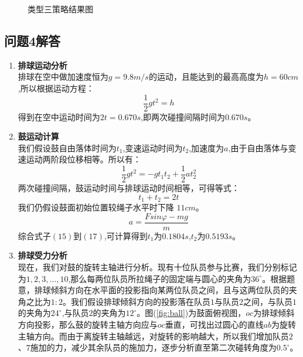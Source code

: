 \documentclass{cumcm}
\begin{document}
\begin{itemize}
\begin{figure}[H]
\caption{类型三策略结果图}
\label{figtype4}
\end{figure}



\end{itemize}
\subsection{问题4解答}
\begin{enumerate}
\item \textbf{排球运动分析}\\
排球在空中做加速度恒为$g=9.8m/s$的运动，且能达到的最高高度为$h=60cm$,所以根据运动方程：
\begin{displaymath}
\frac{1}{2}gt^2=h
\end{displaymath}
得到在空中运动时间为$2t=0.670s$,即两次碰撞间隔时间为$0.670s$。
\item\textbf{鼓运动计算}\\
我们假设鼓自由落体时间为$t_1$,变速运动时间为$t_2$,加速度为$a$,由于自由落体与变速运动两阶段位移相等。所以有：
\begin{equation}
\frac{1}{2}gt^2=-gt_1t_2+\frac{1}{2}at_2^2
\end{equation}
两次碰撞间隔，鼓运动时间与排球运动时间相等，可得等式：
\begin{equation}
t_1+t_2=2t
\end{equation}
我们仍假设鼓面初始位置较绳子水平时下降 $11cm$。
\begin{equation}
a=\frac{Fsin\varphi-mg}{m}
\end{equation}
综合式子$(15)$到$(17)$,可计算得到$t_1$为$0.1804s$,$t_2$为$0.5193s$。
\item \textbf{排球受力分析}\\
现在，我们对鼓的旋转主轴进行分析。现有十位队员参与比赛，我们分别标记为$1,2,3,\dots,10$,那么每两位队员所拉绳子的固定端与圆心的夹角为$36^{\circ}$。根据题意，排球倾斜方向在水平面的投影指向某两位队员之间，且与这两位队员的夹角之比为$1:2$。我们假设排球倾斜方向的投影落在队员$1$与队员$2$之间，与队员$1$的夹角为$24^{\circ}$,与队员$2$的夹角为$12^{\circ}$。图(\ref{fig:ball})为鼓面俯视图，$oc$为排球倾斜方向投影，那么鼓的旋转主轴方向应与$oc$垂直，可找出过圆心的直线$ab$为旋转主轴方向。而由于离旋转主轴越远，对旋转的影响越大，所以我们增加队员$2$、$7$施加的力，减少其余队员的施加力，逐步分析直至第二次碰转角度为$0.5^{\circ}$。
\begin{figure}[H]
\centering

\end{figure}
\end{enumerate}
\end{document}
